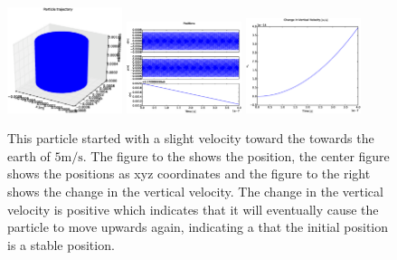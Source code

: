 \documentclass[x11names]{article}
\begin{document}
  \begin{figure}
      \centering
       \includegraphics[width = 0.30\textwidth]{figures/6--5/3Dplot}
      \includegraphics[width = 0.30\textwidth]{figures/6--5/xyz}
      \includegraphics[width = 0.30\textwidth]{figures/6--5/vertical_vel}
       \caption{ This particle started with a slight velocity toward the towards the earth of \(5 \si{\meter\per\second}\). The figure to the shows the position, the center figure shows the positions as xyz coordinates and the figure to the right shows the change in the vertical velocity. The change in the vertical velocity is positive which indicates that it will eventually cause the particle to move upwards again, indicating a that the initial position is a stable position.}
      \label{fig:down_perturbation}
    \end{figure}
\end{document}

